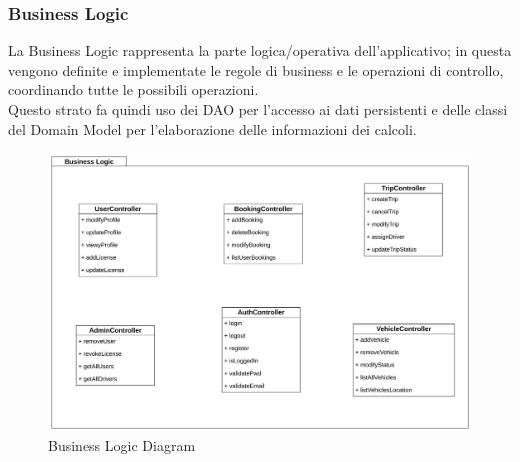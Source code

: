 \subsubsection{Business Logic}\label{subsec:BL}
La Business Logic rappresenta la parte logica/operativa dell'applicativo; in questa vengono definite e implementate le regole di business e le operazioni di controllo, coordinando tutte le possibili operazioni.\\
Questo strato fa quindi uso dei DAO per l'accesso ai dati persistenti e delle classi del Domain Model per l'elaborazione delle informazioni dei calcoli.
\begin{figure}[H]
    \centering
    \includegraphics[width=1\linewidth]{Images/BusinessLogic_diag.png}
    \caption{Business Logic Diagram}
    \label{fig:BLdiag}
\end{figure}

